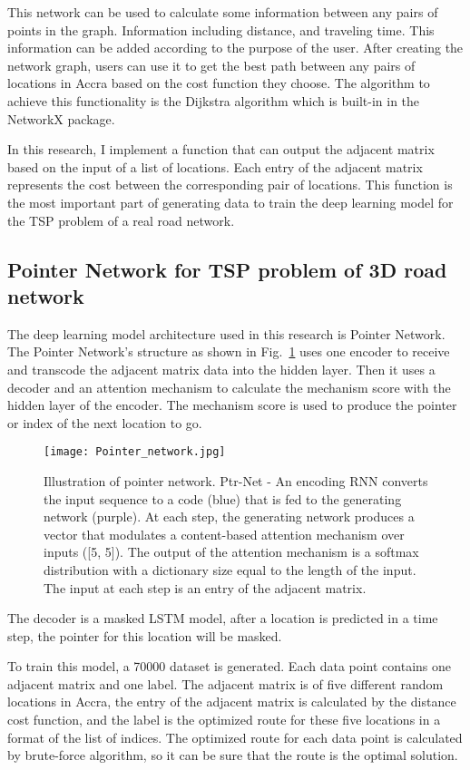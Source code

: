 \documentclass[final-report]{report-template}
\begin{document}
This network can be used to calculate some information between any pairs of points in the graph.
Information including distance, and traveling time. This information can be added according to the purpose of the user.
After creating the network graph, users can use it to get the best path between any pairs of locations in Accra based on the cost function they choose.
The algorithm to achieve this functionality is the Dijkstra algorithm which is built-in in the NetworkX package.

In this research, I implement a function that can output the adjacent matrix based on the input of a list of locations.
Each entry of the adjacent matrix represents the cost between the corresponding pair of locations. 
This function is the most important part of generating data to train the deep learning model for the TSP problem of a real road network.

\subsection {Pointer Network for TSP problem of 3D road network}
The deep learning model architecture used in this research is Pointer Network\cite{vinyals2017pointer}.
The Pointer Network's structure as shown in Fig.~\ref{fig:pointernet} uses one encoder to receive and transcode the adjacent matrix data into the hidden layer.
Then it uses a decoder and an attention mechanism to calculate the mechanism score with the hidden layer of the encoder.
The mechanism score is used to produce the pointer or index of the next location to go.
\begin{figure}[H]
    \centering
    \texttt{[image: Pointer\_network.jpg]}
    \caption{\label{fig:pointernet}Illustration of pointer network. Ptr-Net - An encoding RNN converts the input sequence to a code (blue) that is fed to the generating network (purple). At each step, the generating network produces a vector that modulates a content-based attention mechanism over inputs ([5, 5]). The output of the attention mechanism is a softmax distribution with a dictionary size equal to the length of the input. The input at each step is an entry of the adjacent matrix.}
\end{figure}
The decoder is a masked LSTM model, after a location is predicted in a time step, the pointer for this location will be masked.

To train this model, a 70000 dataset is generated. Each data point contains one adjacent matrix and one label.
The adjacent matrix is of five different random locations in Accra, the entry of the adjacent matrix is calculated by the distance cost function,
and the label is the optimized route for these five locations in a format of the list of indices.
The optimized route for each data point is calculated by brute-force algorithm, so it can be sure that the route is the optimal solution.
\end{document}
